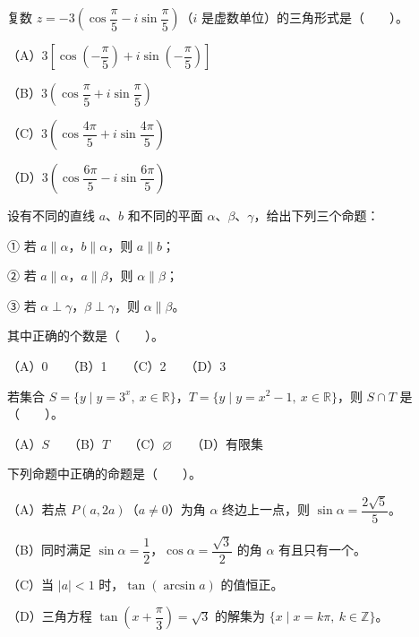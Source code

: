 \begin{question}
复数 $z=-3\left(\cos\dfrac{\pi}{5}-i\sin\dfrac{\pi}{5}\right)$（$i$ 是虚数单位）的三角形式是\mbox{（　　）}。

（A）$3\left[\cos\left(-\dfrac{\pi}{5}\right)+i\sin\left(-\dfrac{\pi}{5}\right)\right]$

（B）$3\left(\cos\dfrac{\pi}{5}+i\sin\dfrac{\pi}{5}\right)$

（C）$3\left(\cos\dfrac{4\pi}{5}+i\sin\dfrac{4\pi}{5}\right)$

（D）$3\left(\cos\dfrac{6\pi}{5}-i\sin\dfrac{6\pi}{5}\right)$

\end{question}
\begin{question}
设有不同的直线 $a$、$b$ 和不同的平面 $\alpha$、$\beta$、$\gamma$，给出下列三个命题：

① 若 $a\parallel\alpha$，$b\parallel\alpha$，则 $a\parallel b$；

② 若 $a\parallel\alpha$，$a\parallel\beta$，则 $\alpha\parallel\beta$；

③ 若 $\alpha\perp\gamma$，$\beta\perp\gamma$，则 $\alpha\parallel\beta$。

其中正确的个数是\mbox{（　　）}。

（A）0　　（B）1　　（C）2　　（D）3

\end{question}
\begin{question}
若集合 $S=\{y\mid y=3^x,\ x\in\mathbb{R}\}$，$T=\{y\mid y=x^2-1,\ x\in\mathbb{R}\}$，则 $S\cap T$ 是\mbox{（　　）}。

（A）$S$　　（B）$T$　　（C）$\varnothing$　　（D）有限集

\end{question}
\begin{question}
下列命题中正确的命题是\mbox{（　　）}。

（A）若点 $P(a,2a)$（$a\ne0$）为角 $\alpha$ 终边上一点，则 $\sin\alpha=\dfrac{2\sqrt5}{5}$。

（B）同时满足 $\sin\alpha=\dfrac12$，$\cos\alpha=\dfrac{\sqrt3}{2}$ 的角 $\alpha$ 有且只有一个。

（C）当 $|a|<1$ 时，$\tan(\arcsin a)$ 的值恒正。

（D）三角方程 $\tan\left(x+\dfrac{\pi}{3}\right)=\sqrt3$ 的解集为 $\{x\mid x=k\pi,\ k\in\mathbb{Z}\}$。

\end{question}

